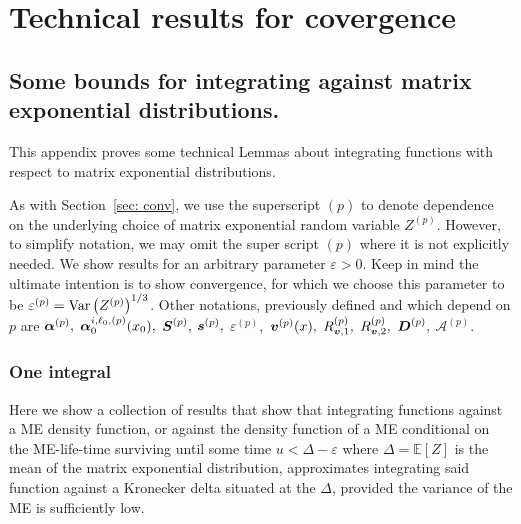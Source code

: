\chapter{Technical results for covergence\label{app:tand}}
\section{Some bounds for integrating against matrix exponential distributions.}\label{appendix: bounds}
This appendix proves some technical Lemmas about integrating functions with respect to matrix exponential distributions. 

As with Section~\ref{sec: conv}, we use the superscript \((p)\) to denote dependence on the underlying choice of matrix exponential random variable \(Z^{(p)}\). However, to simplify notation, we may omit the super script \((p)\) where it is not explicitly needed. We show results for an arbitrary parameter \(\varepsilon>0\). Keep in mind the ultimate intention is to show convergence, for which we choose this parameter to be \(\varepsilon^{(p)}=\mathrm{Var}\left(Z^{(p)}\right)^{1/3}\). Other notations, previously defined and which depend on \(p\) are \(\boldsymbol\alpha^{(p)},\) \(\boldsymbol \alpha_0^{i,\ell_0,(p)}(x_0),\) \(\boldsymbol S^{(p)},\) \(\boldsymbol s^{(p)},\) \(\varepsilon^{(p)},\) \({\boldsymbol v}^{(p)}(x),\) \(R_{{\boldsymbol v},1}^{(p)},\) \(R_{{\boldsymbol v},2}^{(p)},\) \(\boldsymbol D^{(p)},\) \( \mathcal A^{(p)}\).

\subsection{One integral}\label{appendix: int one}
 Here we show a collection of results that show that integrating functions against a ME density function, or against the density function of a ME conditional on the ME-life-time surviving until some time \(u<\Delta-\varepsilon\) where \(\Delta = \mathbb E[Z]\) is the mean of the matrix exponential distribution, approximates integrating said function against a Kronecker delta situated at the \(\Delta\), provided the variance of the ME is sufficiently low. %
  
